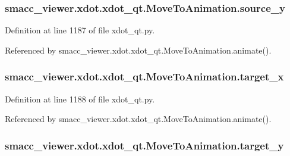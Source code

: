 \subsubsection[{\texorpdfstring{source\+\_\+y}{source_y}}]{\setlength{\rightskip}{0pt plus 5cm}smacc\+\_\+viewer.\+xdot.\+xdot\+\_\+qt.\+Move\+To\+Animation.\+source\+\_\+y}\hypertarget{classsmacc__viewer_1_1xdot_1_1xdot__qt_1_1MoveToAnimation_a2f112551579377e84006d0fa11502e45}{}\label{classsmacc__viewer_1_1xdot_1_1xdot__qt_1_1MoveToAnimation_a2f112551579377e84006d0fa11502e45}


Definition at line 1187 of file xdot\+\_\+qt.\+py.



Referenced by smacc\+\_\+viewer.\+xdot.\+xdot\+\_\+qt.\+Move\+To\+Animation.\+animate().

\subsubsection[{\texorpdfstring{target\+\_\+x}{target_x}}]{\setlength{\rightskip}{0pt plus 5cm}smacc\+\_\+viewer.\+xdot.\+xdot\+\_\+qt.\+Move\+To\+Animation.\+target\+\_\+x}\hypertarget{classsmacc__viewer_1_1xdot_1_1xdot__qt_1_1MoveToAnimation_a7a7a24555d78e358db021b1685d35916}{}\label{classsmacc__viewer_1_1xdot_1_1xdot__qt_1_1MoveToAnimation_a7a7a24555d78e358db021b1685d35916}


Definition at line 1188 of file xdot\+\_\+qt.\+py.



Referenced by smacc\+\_\+viewer.\+xdot.\+xdot\+\_\+qt.\+Move\+To\+Animation.\+animate().

\subsubsection[{\texorpdfstring{target\+\_\+y}{target_y}}]{\setlength{\rightskip}{0pt plus 5cm}smacc\+\_\+viewer.\+xdot.\+xdot\+\_\+qt.\+Move\+To\+Animation.\+target\+\_\+y}\hypertarget{classsmacc__viewer_1_1xdot_1_1xdot__qt_1_1MoveToAnimation_adf69b91918027d26503debdd035b822c}{}\label{classsmacc__viewer_1_1xdot_1_1xdot__qt_1_1MoveToAnimation_adf69b91918027d26503debdd035b822c}


